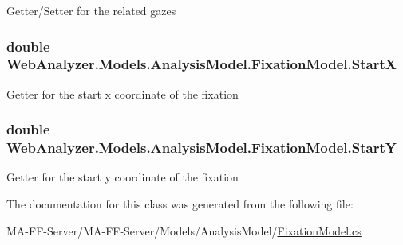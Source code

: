 Getter/\+Setter for the related gazes 

\hypertarget{class_web_analyzer_1_1_models_1_1_analysis_model_1_1_fixation_model_af8b292c9e9e04c3b1b1c617fe3a44e06}{}
\subsubsection[{Start\+X}]{\setlength{\rightskip}{0pt plus 5cm}double Web\+Analyzer.\+Models.\+Analysis\+Model.\+Fixation\+Model.\+Start\+X\hspace{0.3cm}{\ttfamily [get]}}\label{class_web_analyzer_1_1_models_1_1_analysis_model_1_1_fixation_model_af8b292c9e9e04c3b1b1c617fe3a44e06}


Getter for the start x coordinate of the fixation 

\hypertarget{class_web_analyzer_1_1_models_1_1_analysis_model_1_1_fixation_model_a187714460ee0851def122bd776fbda91}{}
\subsubsection[{Start\+Y}]{\setlength{\rightskip}{0pt plus 5cm}double Web\+Analyzer.\+Models.\+Analysis\+Model.\+Fixation\+Model.\+Start\+Y\hspace{0.3cm}{\ttfamily [get]}}\label{class_web_analyzer_1_1_models_1_1_analysis_model_1_1_fixation_model_a187714460ee0851def122bd776fbda91}


Getter for the start y coordinate of the fixation 



The documentation for this class was generated from the following file\+:\begin{DoxyCompactItemize}
\item 
M\+A-\/\+F\+F-\/\+Server/\+M\+A-\/\+F\+F-\/\+Server/\+Models/\+Analysis\+Model/\hyperlink{_fixation_model_8cs}{Fixation\+Model.\+cs}\end{DoxyCompactItemize}
